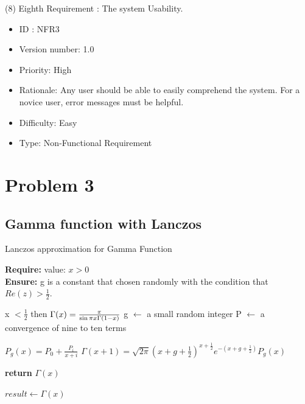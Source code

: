 \documentclass[12pt,a4paper]{report}
\begin{document}
(8) Eighth Requirement : The system Usability.

\begin{itemize}
    \item ID : NFR3
    \item Version number: 1.0
    \item Priority: High
    \item Rationale: Any user should be able to easily comprehend the system. For a novice user, error messages must be helpful.
    \item Difficulty: Easy
    \item Type: Non-Functional Requirement
\end{itemize}


\chapter{Problem 3}
\section{Gamma function with Lanczos}

\begin{algorithm}
\caption{Lanczos approximation for Gamma Function}

\textbf{Require:}  value: $x > 0$  \\
\textbf{Ensure:} g is a constant that chosen randomly with the condition that  $ Re(z) > \frac{1}{2}$.

\begin{algorithmic}[1]

    \If x $< \frac{1}{2}$ then
    \State  $\Gamma (x)={\pi  \over \sin \pi x \Gamma (1-x)}$ 
    \EndIf
    \State g $\leftarrow$  a small random integer
    \State P $\leftarrow$ a convergence of nine to ten terms 
    
    
    \State $P_{g}(x)=P_{0}+{\frac  {P_{i}}{x+i}}$
    \EndFor
    \State ${\displaystyle \Gamma (x+1)={\sqrt {2\pi }}{\left(x+g+{\tfrac {1}{2}}\right)}^{x+{\frac {1}{2}}}e^{-\left(x+g+{\frac {1}{2}}\right)}P_{g}(x)}$
    
    \State \textbf{return} $\Gamma (x)$
    \EndProcedure
\Statex

\State $result \leftarrow \Gamma (x)$ 

\end{algorithmic}
\end{algorithm}
\end{document}
